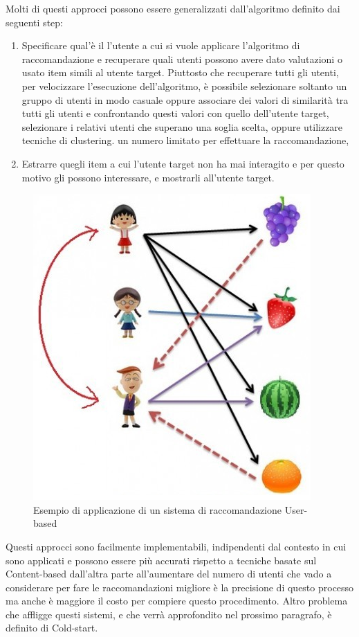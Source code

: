 Molti di questi approcci possono essere generalizzati dall'algoritmo definito dai seguenti step:
\begin{enumerate}
	\item Specificare qual'è il l'utente a cui si vuole applicare l'algoritmo di raccomandazione e recuperare quali utenti possono 
	avere dato valutazioni o usato item simili al utente target. Piuttosto che recuperare tutti gli utenti, per velocizzare l'esecuzione
	dell'algoritmo, è possibile selezionare soltanto un gruppo di utenti in modo casuale oppure associare dei valori di similarità tra 
	tutti gli utenti e confrontando questi valori con quello dell'utente target, selezionare i relativi utenti che superano una soglia
	scelta, oppure utilizzare tecniche di clustering. 
	un numero limitato per effettuare la raccomandazione, 
	\item Estrarre quegli item a cui l'utente target non ha mai interagito e per questo motivo gli possono interessare, e mostrarli 
	all'utente target.
\end{enumerate}

\begin{figure}[ht!]
	\centering
	\includegraphics[scale=0.5]{images/UB_CF_ex.PNG}
	\caption{Esempio di applicazione di un sistema di raccomandazione User-based}
	\label{fig:UB_CF}
\end{figure}

Questi approcci sono facilmente implementabili, indipendenti dal contesto in cui sono applicati e possono essere più accurati rispetto
a tecniche basate sul Content-based dall'altra parte all'aumentare del numero di utenti che vado a considerare per fare le 
raccomandazioni migliore è la precisione di questo processo ma anche è maggiore il costo per compiere questo procedimento. Altro 
problema che affligge questi sistemi, e che verrà approfondito nel prossimo paragrafo, è definito di Cold-start. 

